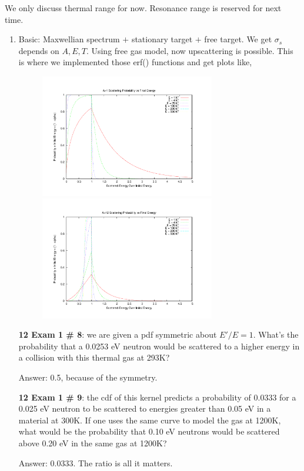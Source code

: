 \documentclass{school-22.211-notes}
\begin{document}
\clearpage
{}
We only discuss thermal range for now. Resonance range is reserved for next time. 
\begin{enumerate}
\item Basic: Maxwellian spectrum $+$ stationary target $+$ free target. We get $\sigma_s$ depends on $A, E, T$. Using free gas model, now upscattering is possible. This is where we implemented those erf() functions and get plots like, 
  \begin{figure}[ht]
  \centering
  \includegraphics[width=3in]{images/sl-d/ts_H.uncrop.pdf}
  \includegraphics[width=3in]{images/sl-d/ts_C.uncrop.pdf}
\end{figure}
 
\textbf{12 Exam 1 \# 8}: we are given a pdf symmetric about $E'/E = 1$. What's the probability that a 0.0253 eV neutron would be scattered to a higher energy in a collision with this thermal gas at 293K? 

Answer: 0.5, because of the symmetry. 

\textbf{12 Exam 1 \# 9}: the cdf of this kernel predicts a probability of 0.0333 for a 0.025 eV neutron to be scattered to energies greater than 0.05 eV in a material at 300K. If one uses the same curve to model the gas at 1200K, what would be the probability that 0.10 eV neutrons would be scattered above 0.20 eV in the same gas at 1200K? 

Answer: 0.0333. The ratio is all it matters. 


\end{enumerate}
\end{document}
